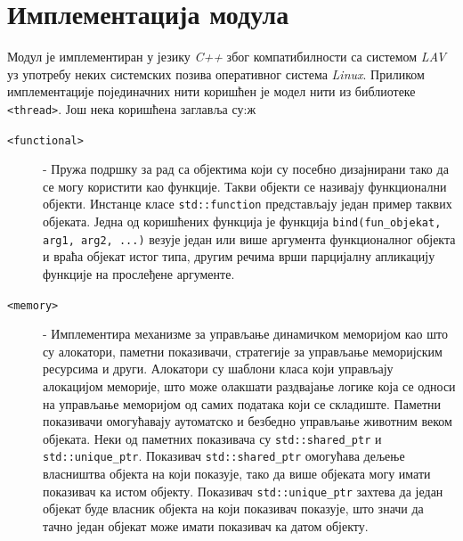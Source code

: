 \documentclass[12pt,oneside]{memoir}
\begin{document}
\section{Имплементација модула}
Модул је имплементиран у језику \textit{C++} због компатибилности са системом \textit{LAV} уз употребу неких системских позива оперативног система \textit{Linux}. Приликом имплементације појединачних нити коришћен је модел нити из библиотеке \texttt{<thread>}. Још нека коришћена заглавља су:ж

\begin{description}

\item[\texttt{<functional>}] - Пружа подршку за рад са објектима који су посебно дизајнирани тако да се могу користити као функције. Такви објекти се називају функционални објекти. Инстанце класе \texttt{std::function} представљају један пример таквих објеката. Једна од коришћених функција је функција \texttt{bind(fun\_objekat, arg1, arg2, ...)}  везује један или више аргумента функционалног објекта и враћа објекат истог типа, другим речима врши парцијалну апликацију функције на прослеђене аргументе.

\item[\texttt{<memory>}] - Имплементира механизме за управљање динамичком меморијом као што су алокатори, паметни показивачи, стратегије за управљање меморијским ресурсима и други. Алокатори су шаблони класа који управљају алокацијом меморије, што може олакшати раздвајање логике која се односи на управљање меморијом од самих података који се складиште. Паметни показивачи омогућавају аутоматско и безбедно управљање животним веком објеката. Неки од паметних показивача су \texttt{std::shared\_ptr} и \texttt{std::unique\_ptr}. Показивач \texttt{std::shared\_ptr} омогућава дељење власништва објекта на који показује, тако да више објеката могу имати показивач ка истом објекту. Показивач \texttt{std::unique\_ptr} захтева да један објекат буде власник објекта на који показивач показује, што значи да тачно један објекат може имати показивач ка датом објекту.   

\end{description}
\end{document}
